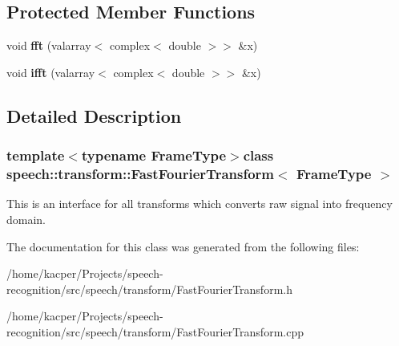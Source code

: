 \subsection*{Protected Member Functions}
\begin{DoxyCompactItemize}
\item 
\hypertarget{classspeech_1_1transform_1_1FastFourierTransform_acddbd44871c490f772dce7fb93037a21}{void {\bfseries fft} (valarray$<$ complex$<$ double $>$$>$ \&x)}\label{classspeech_1_1transform_1_1FastFourierTransform_acddbd44871c490f772dce7fb93037a21}

\item 
\hypertarget{classspeech_1_1transform_1_1FastFourierTransform_aac095c5a293ee3c3072e1cabf17ceaac}{void {\bfseries ifft} (valarray$<$ complex$<$ double $>$$>$ \&x)}\label{classspeech_1_1transform_1_1FastFourierTransform_aac095c5a293ee3c3072e1cabf17ceaac}

\end{DoxyCompactItemize}


\subsection{Detailed Description}
\subsubsection*{template$<$typename Frame\+Type$>$class speech\+::transform\+::\+Fast\+Fourier\+Transform$<$ Frame\+Type $>$}

This is an interface for all transforms which converts raw signal into frequency domain. 

The documentation for this class was generated from the following files\+:\begin{DoxyCompactItemize}
\item 
/home/kacper/\+Projects/speech-\/recognition/src/speech/transform/Fast\+Fourier\+Transform.\+h\item 
/home/kacper/\+Projects/speech-\/recognition/src/speech/transform/Fast\+Fourier\+Transform.\+cpp\end{DoxyCompactItemize}
